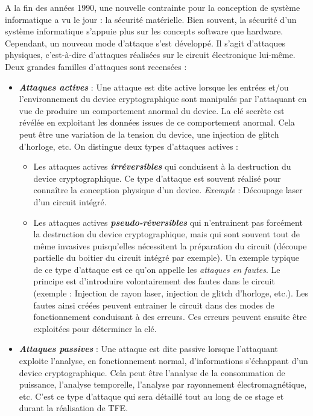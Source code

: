 \documentclass[10pt, oneside, a4paper]{article}
\begin{document}
A la fin des années 1990, une nouvelle contrainte pour la conception de système informatique a vu le jour : la sécurité matérielle. Bien souvent, la sécurité d'un système informatique s'appuie plus sur les concepts software que hardware. Cependant, un nouveau mode d'attaque s'est développé. Il s'agit d'attaques physiques, c'est-à-dire d'attaques réalisées sur le circuit électronique lui-même. Deux grandes familles d'attaques sont recensées : 
\begin{itemize}
\item \textbf{\textit{Attaques actives}} : Une attaque est dite active lorsque les entrées et/ou l'environnement du device cryptographique sont manipulés par l'attaquant en vue de produire un comportement anormal du device. La clé secrète est révélée en exploitant les données issues de ce comportement anormal. Cela peut être une variation de la tension du device, une injection de glitch d'horloge, etc. On distingue deux types d'attaques actives : 
\begin{itemize}
\item Les attaques actives \textbf{\textit{irréversibles}} qui conduisent à la destruction du device cryptographique. Ce type d'attaque est souvent réalisé pour connaître la conception physique d'un device. \textit{Exemple} : Découpage laser d’un circuit intégré.
\item Les attaques actives \textbf{\textit{pseudo-réversibles}} qui n’entrainent pas forcément la destruction du device cryptographique, mais qui sont souvent tout de même invasives puisqu’elles nécessitent la préparation du circuit (découpe partielle du boitier du circuit intégré par exemple). Un exemple typique de ce type d'attaque est ce qu'on appelle les \textit{attaques en fautes}. Le principe est d'introduire volontairement des fautes dans le circuit (exemple : Injection de rayon laser, injection de glitch d’horloge, etc.). Les fautes ainsi créées peuvent entrainer le circuit dans des modes de fonctionnement conduisant à des erreurs. Ces erreurs peuvent ensuite être exploitées pour déterminer la clé.
\end{itemize}
\item \textbf{\textit{Attaques passives}} : Une attaque est dite passive lorsque l'attaquant exploite l'analyse, en fonctionnement normal, d'informations s'échappant d'un device cryptographique. Cela peut être l'analyse de la consommation de puissance, l'analyse temporelle, l'analyse par rayonnement électromagnétique, etc. C'est ce type d'attaque qui sera détaillé tout au long de ce stage et durant la réalisation de TFE. \\
\end{itemize}
\end{document}

